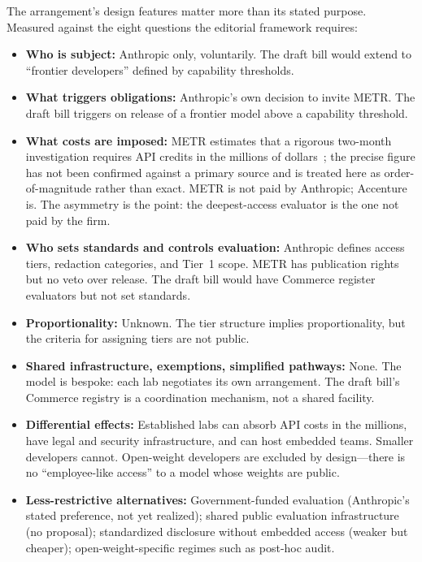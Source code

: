 The arrangement's design features matter more than its stated purpose. Measured against the eight questions the editorial framework requires:

\begin{itemize}
\item \textbf{Who is subject:} Anthropic only, voluntarily. The draft bill would extend to ``frontier developers'' defined by capability thresholds.
\item \textbf{What triggers obligations:} Anthropic's own decision to invite METR. The draft bill triggers on release of a frontier model above a capability threshold.
\item \textbf{What costs are imposed:} METR estimates that a rigorous two-month investigation requires API credits in the millions of dollars~\cite{metr2026a}; the precise figure has not been confirmed against a primary source and is treated here as order-of-magnitude rather than exact. METR is not paid by Anthropic; Accenture is. The asymmetry is the point: the deepest-access evaluator is the one not paid by the firm.
\item \textbf{Who sets standards and controls evaluation:} Anthropic defines access tiers, redaction categories, and Tier~1 scope. METR has publication rights but no veto over release. The draft bill would have Commerce register evaluators but not set standards.
\item \textbf{Proportionality:} Unknown. The tier structure implies proportionality, but the criteria for assigning tiers are not public.
\item \textbf{Shared infrastructure, exemptions, simplified pathways:} None. The model is bespoke: each lab negotiates its own arrangement. The draft bill's Commerce registry is a coordination mechanism, not a shared facility.
\item \textbf{Differential effects:} Established labs can absorb API costs in the millions, have legal and security infrastructure, and can host embedded teams. Smaller developers cannot. Open-weight developers are excluded by design---there is no ``employee-like access'' to a model whose weights are public.
\item \textbf{Less-restrictive alternatives:} Government-funded evaluation (Anthropic's stated preference, not yet realized); shared public evaluation infrastructure (no proposal); standardized disclosure without embedded access (weaker but cheaper); open-weight-specific regimes such as post-hoc audit.
\end{itemize}

